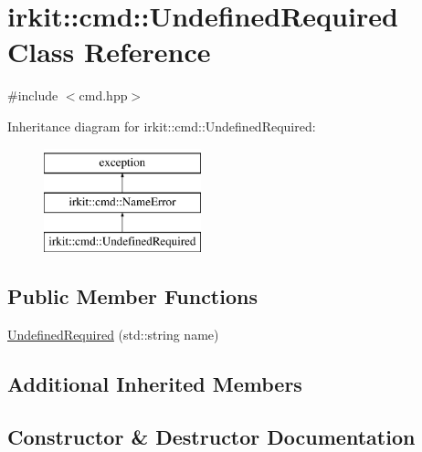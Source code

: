 \hypertarget{classirkit_1_1cmd_1_1UndefinedRequired}{}\section{irkit\+:\+:cmd\+:\+:Undefined\+Required Class Reference}
\label{classirkit_1_1cmd_1_1UndefinedRequired}


{\ttfamily \#include $<$cmd.\+hpp$>$}

Inheritance diagram for irkit\+:\+:cmd\+:\+:Undefined\+Required\+:\begin{figure}[H]
\begin{center}
\leavevmode
\includegraphics[height=3.000000cm]{classirkit_1_1cmd_1_1UndefinedRequired}
\end{center}
\end{figure}
\subsection*{Public Member Functions}
\begin{DoxyCompactItemize}
\item 
\mbox{\hyperlink{classirkit_1_1cmd_1_1UndefinedRequired_a97382e50a735fe676a581269c67ed91f}{Undefined\+Required}} (std\+::string name)
\end{DoxyCompactItemize}
\subsection*{Additional Inherited Members}


\subsection{Constructor \& Destructor Documentation}
\mbox{\label{classirkit_1_1cmd_1_1UndefinedRequired_a97382e50a735fe676a581269c67ed91f}} 
